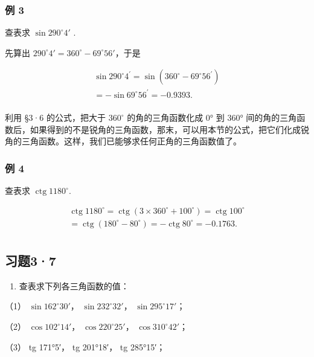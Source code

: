 \subsubsection{例 3}

查表求 \(\sin 290^{\circ}4'\) .

 先算出
\(290^{\circ}4' = 360^{\circ} - 69^{\circ}56'\)，于是

\[
\begin{array}{l} \sin 290 ^{\circ} 4 ^{\prime} = \sin (360 ^{\circ} - 69 ^{\circ} 56 ^{\prime}) \\ = - \sin 69 ^{\circ} 56 ^{\prime} = - 0.9393. \\ \end{array}
\]

利用 §3·6 的公式，把大于 \(360^{\circ}\) 的角的三角函数化成 0° 到 360°
间的角的三角函数后，如果得到的不是锐角的三角函数，那末，可以用本节的公式，把它们化成锐角的三角函数。这样，我们已能够求任何正角的三角函数值了。

\subsubsection{例 4}

查表求 \(\operatorname{ctg} 1180^{\circ}\).


\[
\begin{array}{l} \operatorname{ctg} 1180 ^{\circ} = \operatorname{ctg} (3 \times 360 ^{\circ} + 100 ^{\circ}) = \operatorname{ctg} 100 ^{\circ} \\ = \operatorname{ctg} (180 ^{\circ} - 80 ^{\circ}) = - \operatorname{ctg} 80 ^{\circ} = - 0.1763. \\ \end{array}
\]

\subsection{习题3·7}

\begin{enumerate}
\item
  查表求下列各三角函数的值：
\end{enumerate}

（1） \(\sin 162^{\circ}30'\)， \(\sin 232^{\circ}32'\)，
\(\sin 295^{\circ}17'\)；

（2） \(\cos 102^{\circ}14'\)， \(\cos 220^{\circ}25'\)，
\(\cos 310^{\circ}42'\)；

（3） tg 171°5′， tg 201°18′， tg 285°15′；

